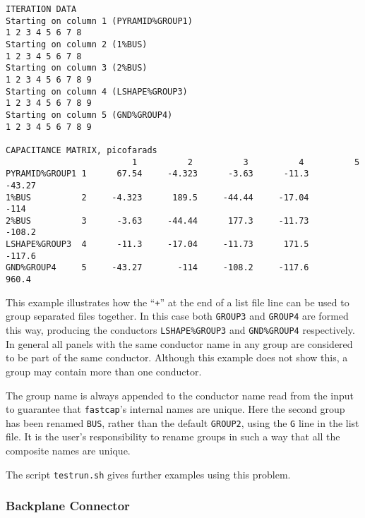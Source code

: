 \begin{verbatim}
ITERATION DATA
Starting on column 1 (PYRAMID%GROUP1)
1 2 3 4 5 6 7 8
Starting on column 2 (1%BUS)
1 2 3 4 5 6 7 8
Starting on column 3 (2%BUS)
1 2 3 4 5 6 7 8 9
Starting on column 4 (LSHAPE%GROUP3)
1 2 3 4 5 6 7 8 9
Starting on column 5 (GND%GROUP4)
1 2 3 4 5 6 7 8 9

CAPACITANCE MATRIX, picofarads
                         1          2          3          4          5
PYRAMID%GROUP1 1      67.54     -4.323      -3.63      -11.3     -43.27
1%BUS          2     -4.323      189.5     -44.44     -17.04       -114
2%BUS          3      -3.63     -44.44      177.3     -11.73     -108.2
LSHAPE%GROUP3  4      -11.3     -17.04     -11.73      171.5     -117.6
GND%GROUP4     5     -43.27       -114     -108.2     -117.6      960.4
\end{verbatim}
This example illustrates how the ``{\tt +}'' at the end of a 
list file line can be used to group separated files together. In this
case both {\tt GROUP3} and {\tt GROUP4} are formed this way, producing
the conductors {\tt LSHAPE\%GROUP3} and {\tt GND\%GROUP4} respectively.
In general all panels with the same conductor name in any group are
considered to be part of the same conductor. Although this
example does not show this, a group may contain
more than one conductor.

The group name is always appended to the conductor name read from the
input to guarantee that {\tt fastcap}'s internal names are unique. 
Here the second group has been renamed {\tt BUS}, rather than
the default {\tt GROUP2}, using the {\tt G} line in the list file.
It is the user's responsibility to rename groups in such a way
that all the composite names are unique.

The script {\tt testrun.sh} gives further examples using this problem.

\subsubsection{Backplane Connector}

